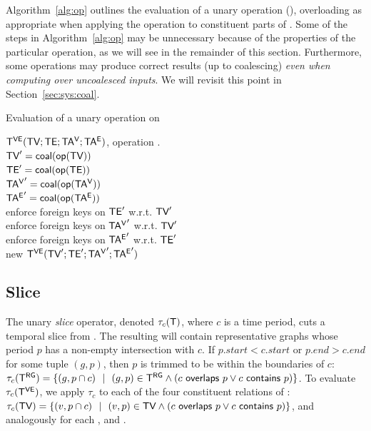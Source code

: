 Algorithm~\ref{alg:op} outlines the evaluation of a unary operation
\opp(\tve), overloading \opp as appropriate when applying the
operation to constituent parts of \tve.  Some of the steps in
Algorithm~\ref{alg:op} may be unnecessary because of the properties of
the particular operation, as we will see in the remainder of this
section.  Furthermore, some operations may produce correct results (up
to coalescing) {\em even when computing over uncoalesced inputs}.
We will revisit this point in
Section~\ref{sec:sys:coal}.

\begin{algorithm}[t]
\caption{Evaluation of a unary operation \opp on \tve}
\begin{algorithmic}[1]
\REQUIRE \tg $\mathsf{T^{VE}} (\textsf{TV}; \textsf{TE}; \mathsf{TA^{V}}; \mathsf{TA^{E}})$, operation .\\
\STATE  $\textsf{TV}' = \textsf{coal} (\textsf{op}(\textsf{TV}))$\\
\STATE  $\textsf{TE}' = \textsf{coal} (\textsf{op}(\textsf{TE}))$\\
\STATE  $\mathsf{TA^{V}}' = \textsf{coal} (\textsf{op}(\mathsf{TA^{V}}))$\\
\STATE  $\mathsf{TA^{E}}' = \textsf{coal} (\textsf{op}(\mathsf{TA^{E}}))$\\
\STATE  enforce foreign keys on $\textsf{TE}'$ w.r.t. $\textsf{TV}'$\\
\STATE  enforce foreign keys on $\mathsf{TA^{V}}'$ w.r.t. $\textsf{TV}'$\\
\STATE  enforce foreign keys on $\mathsf{TA^{E}}'$ w.r.t. $\textsf{TE}'$\\
\RETURN new $\mathsf{T^{VE}} (\textsf{TV}';\textsf{TE}';\mathsf{TA^{V}}';\mathsf{TA^{E}}')$\\
\end{algorithmic}
\label{alg:op}
\end{algorithm}

\subsection{Slice}
\label{sec:algebra:slice}

The unary {\em slice} operator, denoted $\tau_c (\mathsf{T})$, where $c$ is
a time period, cuts a temporal slice from \ttt.  The resulting \tg
will contain representative graphs whose period $p$ has a non-empty
intersection with $c$.  If $p.start < c.start$ or $p.end > c.end$ for
some tuple $(g, p)$, then $p$ is trimmed to be within the boundaries
of $c$: $\tau_c (\mathsf{T^{RG}}) = \{ (g, p \cap c)~~|~~(g, p) \in \mathsf{T^{RG}} \wedge
(c~\mathsf{overlaps}~p \vee c~\mathsf{contains}~p)\}$.
%
To evaluate $\tau_c (\mathsf{T^{VE}})$, we apply $\tau_c$ to each of the four
constituent relations of \tve: $\tau_c (\textsf{TV}) = \{ (v, p \cap
c)~~|~~(v, p) \in \textsf{TV} \wedge (c~\mathsf{overlaps}~p \vee
c~\mathsf{contains}~p) \}$, and analogously for each \te, \tav and
\tae.

